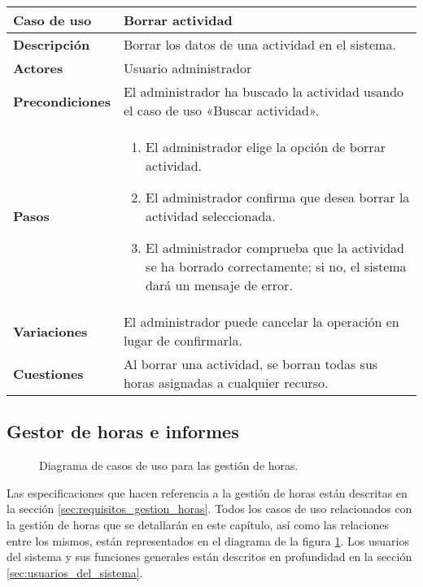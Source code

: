 \begin{tabular}{|p{1.25in}|p{3.65in}|}\hline
\textbf{Caso de uso} & \textbf{Borrar actividad}\\\hline\hline
\textbf{Descripción} & Borrar los datos de una actividad en el sistema. \\\hline
\textbf{Actores} & Usuario administrador\\\hline
\textbf{Precondiciones} & El administrador ha
buscado la actividad usando el caso de uso «Buscar actividad».\\\hline
\textbf{Pasos} & 
  \begin{enumerate}
   \item El administrador elige la opción de borrar actividad.
   \item El administrador confirma que desea borrar la actividad seleccionada.
   \item El administrador comprueba que la actividad se ha borrado
correctamente; si no, el sistema dará un mensaje de error.
  \end{enumerate}
\\\hline
\textbf{Variaciones} & El administrador puede cancelar la operación en lugar
de confirmarla.\\\hline
\textbf{Cuestiones} & Al borrar una actividad, se borran todas sus horas
asignadas a cualquier recurso.\\\hline
\end{tabular}

\subsection{Gestor de horas e informes}

\begin{figure}
\centering
{}
\caption{Diagrama de casos de uso para las gestión de horas.}
\label{fig:CU_horas}
\end{figure}

Las especificaciones que hacen referencia a la gestión de horas están
descritas en la sección \ref{sec:requisitos_gestion_horas}. Todos los casos de
uso relacionados con la gestión de horas que se detallarán en este
capítulo, así como las relaciones entre los mismos, están representados en el
diagrama de la figura \ref{fig:CU_horas}. Los usuarios del sistema y sus
funciones generales están descritos en profundidad en la sección
\ref{sec:usuarios_del_sistema}.


